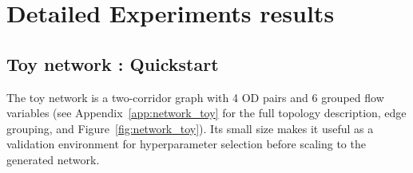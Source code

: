 \documentclass[11pt]{article}
\begin{document}
\begin{table}[h]
\centering
\caption{Simulation and BO configurations for the benchmark networks.
$d$ denotes the OD search space dimension (number of calibrated OD 
pairs). Init.\ points is the Sobol sample size $N_0$ before BO starts.
Epochs $T$ is the total number of simulator evaluations after 
initialization. Num.\ restarts and Raw samples control the 
multi-start L-BFGS acquisition optimizer. All experiments use 
batch size 1 (sequential BO) and 5 independent runs with different 
random seeds.}
\label{tab:bo_configs}
\end{table}

\section{Detailed Experiments results }
\label{sec:detailed_experiments}


\subsection{Toy network : Quickstart}

The toy network is a two-corridor graph with 4 OD pairs and 6 grouped flow variables
(see Appendix~\ref{app:network_toy} for the full topology description, edge grouping,
and Figure~\ref{fig:network_toy}). Its small size makes it useful as a validation
environment for hyperparameter selection before scaling to the generated network.
\end{document}
